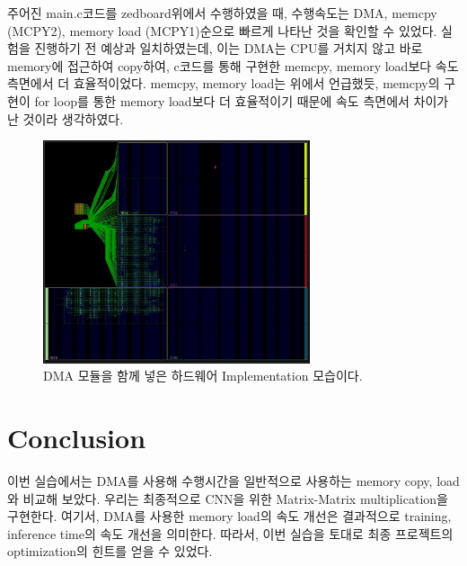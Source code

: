 \documentclass{article}
\begin{document}
주어진 main.c코드를 zedboard위에서 수행하였을 때, 수행속도는 DMA, memcpy (MCPY2), memory load (MCPY1)순으로 빠르게 나타난 것을 확인할 수 있었다. 실험을 진행하기 전 예상과 일치하였는데, 이는 DMA는 CPU를 거치지 않고 바로 memory에 접근하여 copy하여, c코드를 통해 구현한 memcpy, memory load보다 속도 측면에서 더 효율적이었다.
memcpy, memory load는 위에서 언급했듯, memcpy의 구현이 for loop를 통한 memory load보다 더 효율적이기 때문에 속도 측면에서 차이가 난 것이라 생각하였다.

\begin{figure}[htb!]
	\centering
	\includegraphics[width=0.7\textwidth]{fig/implementation.jpg}
\caption{DMA 모듈을 함께 넣은 하드웨어 Implementation 모습이다.}
\label{fig6}
\end{figure}

\section{Conclusion}
이번 실습에서는 DMA를 사용해 수행시간을 일반적으로 사용하는 memory copy, load와 비교해 보았다.
우리는 최종적으로 CNN을 위한 Matrix-Matrix multiplication을 구현한다. 여기서, DMA를 사용한 memory load의 속도 개선은 결과적으로 training, inference time의 속도 개선을 의미한다. 따라서, 이번 실습을 토대로 최종 프로젝트의 optimization의 힌트를 얻을 수 있었다.



\end{document}
